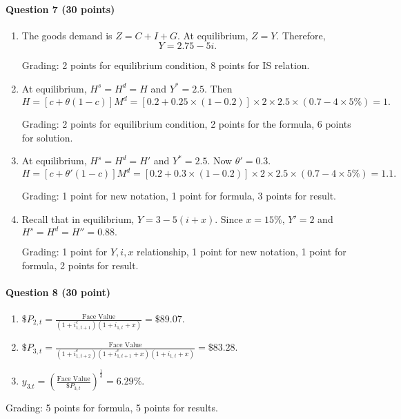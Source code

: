 \documentclass[12pt]{article}
\begin{document}
\paragraph{Question 7 (30 points)}
\begin{enumerate}[label=\alph*.]
	\item The goods demand is $Z=C+I+G$. At equilibrium, $Z=Y$. Therefore,
	\[Y = 2.75 - 5i.\]

	Grading: 2 points for equilibrium condition, 8 points for IS relation.

	\item At equilibrium, $H^s = H^d = H$ and $Y^* = 2.5$. Then
	\[H = [c + \theta(1-c)]M^d = [0.2 + 0.25\times(1-0.2)]\times 2\times 2.5 \times (0.7 - 4 \times 5\%) = 1.\]

	Grading: 2 points for equilibrium condition, 2 points for the formula, 6 points for solution.

	\item At equilibrium, $H^s = H^d = H'$ and $Y^* = 2.5$. Now $\theta' = 0.3$. 
	\[H = [c + \theta'(1-c)]M^d = [0.2 + 0.3\times(1-0.2)]\times 2\times 2.5 \times (0.7 - 4 \times 5\%) = 1.1.\]

	Grading: 1 point for new notation, 1 point for formula, 3 points for result.

	\item Recall that in equilibrium, $Y = 3 - 5(i+x)$. Since $x = 15\%$, $Y' = 2$ and $H^s = H^d = H'' = 0.88.$ 
	
	Grading: 1 point for $Y, i ,x$ relationship, 1 point for new notation, 1 point for formula, 2 points for result.
\end{enumerate}

\paragraph{Question 8 (30 point)}
\begin{enumerate}[label=\alph*.]
	\item $\$P_{2,t} = \frac{\text{Face Value}}{(1+i_{1,t+1}^e)(1+i_{1,t}+x)} = \$89.07.$
	\item $\$P_{3,t} = \frac{\text{Face Value}}{(1+i_{1,t+2}^e)(1+i_{1,t+1}^e+x)(1+i_{1,t}+x)} = \$83.28.$
	\item $y_{3.t} = \left(\frac{\text{Face Value}}{\$P_{3,t}}\right)^{\frac{1}{3}}=6.29\%.$
\end{enumerate}
Grading: 5 points for formula, 5 points for results.
\end{document}
